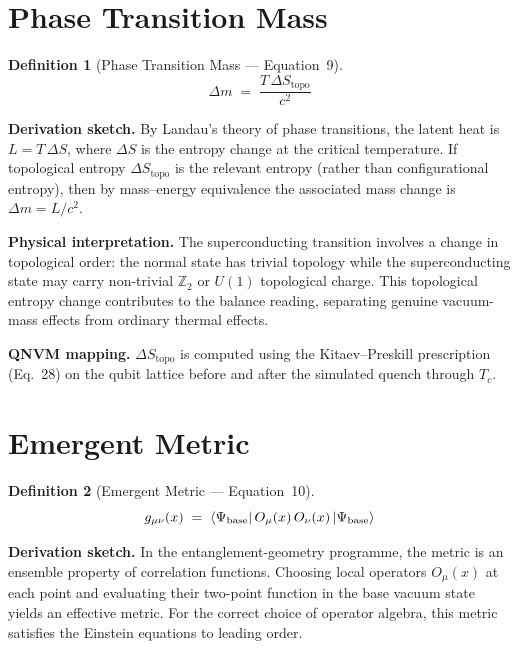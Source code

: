 \documentclass[11pt,a4paper]{article}
\newtheorem{definition}{Definition}[section]
\theoremstyle{remark}
\newcommand{\base}{\Psi_{\text{base}}}
\begin{document}
\section{Phase Transition Mass}
\label{sec:eq9}

\begin{definition}[Phase Transition Mass --- Equation~9]
\begin{equation}\label{eq:phasetrans}
    \Delta m \;=\; \frac{T\,\Delta S_{\text{topo}}}{c^2}
\end{equation}
\end{definition}

\textbf{Derivation sketch.}\quad
By Landau's theory of phase transitions, the latent heat is $L = T\,\Delta S$, where $\Delta S$ is the entropy change at the critical temperature.  If topological entropy $\Delta S_{\text{topo}}$ is the relevant entropy (rather than configurational entropy), then by mass--energy equivalence the associated mass change is $\Delta m = L/c^2$.

\textbf{Physical interpretation.}\quad
The superconducting transition involves a change in topological order: the normal state has trivial topology while the superconducting state may carry non-trivial $\mathbb{Z}_2$ or $U(1)$ topological charge.  This topological entropy change contributes to the balance reading, separating genuine vacuum-mass effects from ordinary thermal effects.

\textbf{QNVM mapping.}\quad
$\Delta S_{\text{topo}}$ is computed using the Kitaev--Preskill prescription (Eq.~28) on the qubit lattice before and after the simulated quench through $T_c$.

\section{Emergent Metric}
\label{sec:eq10}

\begin{definition}[Emergent Metric --- Equation~10]
\begin{equation}\label{eq:emergent}
    g_{\mu\nu}(x) \;=\; \bra{\base} O_\mu(x)\, O_\nu(x) \ket{\base}
\end{equation}
\end{definition}

\textbf{Derivation sketch.}\quad
In the entanglement-geometry programme, the metric is an ensemble property of correlation functions.  Choosing local operators $O_\mu(x)$ at each point and evaluating their two-point function in the base vacuum state yields an effective metric.  For the correct choice of operator algebra, this metric satisfies the Einstein equations to leading order.
\end{document}
